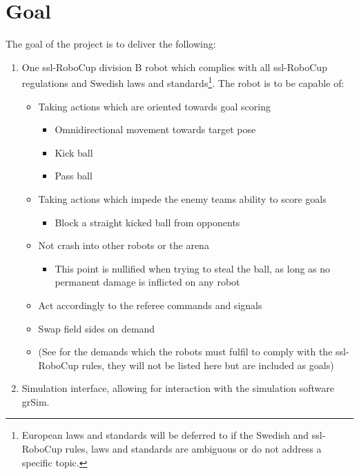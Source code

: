 \section{Goal}
\label{section:goal}

The goal of the project is to deliver the following:
\begin{enumerate}
    \item One \ac{ssl}-RoboCup division B robot which complies with all \ac{ssl}-RoboCup regulations and Swedish laws and standards\footnote{European laws and standards will be deferred to if the Swedish and \ac{ssl}-RoboCup rules, laws and standards are ambiguous or do not address a specific topic.}. The robot is to be capable of:
    \begin{itemize}
        \item Taking actions which are oriented towards goal scoring
        \begin{itemize}
            \item Omnidirectional movement towards target pose
            \item Kick ball
            \item Pass ball
        \end{itemize}
        \item Taking actions which impede the enemy teams ability to score goals
        \begin{itemize}
            \item Block a straight kicked ball from opponents
        \end{itemize}
        \item Not crash into other robots or the arena
        \begin{itemize}
            \item This point is nullified when trying to steal the ball, as long as no permanent damage is inflicted on any robot
        \end{itemize}
        \item Act accordingly to the referee commands and signals
        \item Swap field sides on demand
        \item (See\:\cite{noauthor_rules_2024} for the demands which the robots must fulfil to comply with the \ac{ssl}-RoboCup rules, they will not be listed here but are included as goals)
    \end{itemize}
    \item Simulation interface, allowing for interaction with the simulation software grSim.

\end{enumerate}
